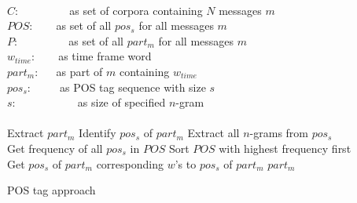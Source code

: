 \begin{algorithm}
\begin{algorithmic} 
\REQUIRE ~\\
\hspace{\algorithmicindent} $C$: ~~~~~~~~ as set of corpora containing $N$ messages $m$ \\ 
\hspace{\algorithmicindent} $POS$: ~~~ as set of all $pos_{s}$ for all messages $m$\\
\hspace{\algorithmicindent} $P$: ~~~~~~~~ as set of all $part_{m}$ for all messages $m$\\

\hspace{\algorithmicindent}	$w_{time}$: ~~~ as time frame word\\
\hspace{\algorithmicindent}	$part_{m}$: ~~ as part of $m$ containing $w_{time}$\\
\hspace{\algorithmicindent}	$pos_{s}$: ~~~~ as POS tag sequence with size $s$\\
\hspace{\algorithmicindent}	$s$: ~~~~~~~~~~ as size of specified $n$-gram\\



\hrulefill
\ENSURE ~\\
		\STATE Extract $part_{m}$
		\STATE Identify $pos_{s}$ of  $part_{m}$
		\STATE Extract all $n$-grams from $pos_{s}$
\ENDFOR \\
\STATE Get frequency of all { $pos_{s}$} in $POS$
\STATE Sort $POS$ with highest frequency first \\
		\STATE Get $pos_{s}$ of $part_{m}$ 
				\RETURN corresponding $w$'s to $pos_{s}$ of $part_{m}$ 
				\ENDIF
		\ENDFOR
		\RETURN $part_{m}$
\ENDFOR
\end{algorithmic}
\caption[Algorithm 3]{POS tag approach}
\label{alg:pos}
\end{algorithm}